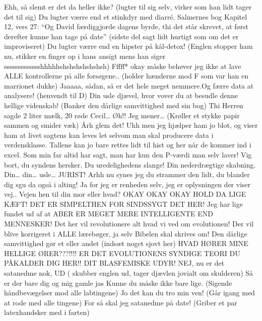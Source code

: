 \documentclass[a4paper,11pt]{article}
\begin{document}
\begin{sketch}
 Ehh, så slemt er det da heller ikke? (lugter til sig selv, virker som han lidt tager det til sig) 
 Du lugter værre end et stinkdyr med diarré. 
 Salmernes bog Kapitel 12, vers 27: “Og David færdiggjorde dagens byrde, thi det står skrevet, at først derefter kunne han tage på date” (sidste del sagt lidt hurtigt som om det er improviseret)     
 Du lugter værre end en hipster på kål-detox! (Englen stopper ham nu, stikker en finger op i hans ansigt mens han siger ssssssssssssshhhhhshshshshshshsh) 
 Fffff* okay måske behøver jeg ikke at lave ALLE kontrollerne på alle forsøgene.. 
 (holder hænderne mod F som var han en marrionet dukke) Jaaaaa, sådan, så er det hele meget nemmere.Og færre data at analysere! 
 (henvendt til D) Din usle djævel, hvor vover du at besudle denne hellige videnskab! (Banker den dårlige samvittighed med sin bog) Thi Herren sagde 2 liter mælk, 20 røde Cecil… Øh!! Jeg mener… (Krøller et stykke papir sammen og smider væk) Årh glem det!
 Uhh men jeg hjælper ham jo blot, og viser ham at livet sagtens kan leves let selvom man skal producere data i verdensklasse. Tallene kan jo bare rettes lidt til hist og her når de kommer ind i excel. Som min far altid har sagt, man har kun den P-værdi man selv laver! 
 Vig bort, du syndens hersker. Du uredelighedens slange! Din nederdrægtige skabning. Din… din… usle… JURIST! 
 Arhh nu synes jeg du strammer den lidt, du blander dig sgu da også i alting!  
 Ja for jeg er renheden selv, jeg er oplysningen der viser vej.. 
 Vejen hen til din mor eller hvad? 
  OKAY OKAY OKAY HOLD DA LIGE KÆFT! DET ER SIMPELTHEN FOR SINDSSYGT DET HER! Jeg har lige fundet ud af at ABER ER MEGET MERE INTELLIGENTE END MENNESKER! Det her vil revolutionere alt hvad vi ved om evolutionen! Der vil blive korrigeret i ALLE lærebøger, ja selv Bibelen skal skrives om! 
\scene Den dårlige samvittighed gør et eller andet (indsæt noget sjovt her)
 HVAD HØRER MINE HELLIGE ØRER???!!!! ER DET EVOLUTIONENS SYNDIGE TEORI DU PÅKALDER DIG HER!! DIT BLASFEMISKE UDYR! 
 NEJ, nu er det satanedme nok, UD ( skubber englen ud, tager djævlen jovialt om skulderen) Så er der bare dig og mig gamle jas Kunne du måske ikke bare lige. (Sigende håndbevægelser mod alle labtingene)
 Jo det kan du tro min ven! (Går igang med at rode med alle tingene) 
 For så skal jeg satanedme på date! (Griber et par latexhandsker med i farten)         

\end{sketch}
\end{document}
